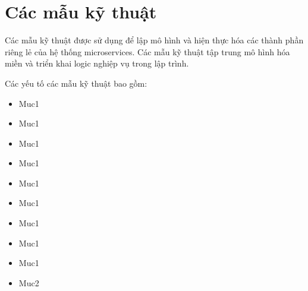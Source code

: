 

















\chapter{Các mẫu kỹ thuật}

Các mẫu kỹ thuật được sử dụng để lập mô hình và hiện thực hóa các thành phần riêng lẻ của hệ thống microservices. Các mẫu kỹ thuật tập trung mô hình hóa miền và triển khai logic nghiệp vụ trong lập trình.

Các yếu tố các mẫu kỹ thuật bao gồm:

\begin{itemize}

\item Muc1

\item Muc1

\item Muc1

\item Muc1

\item Muc1

\item Muc1

\item Muc1

\item Muc1

\item Muc1

\item Muc2

\end{itemize}

